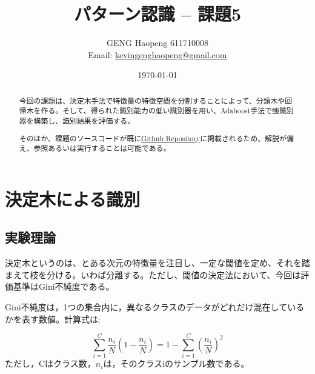 \documentclass[ %
  uplatex,%
  papersize%
]{jsarticle}
\title{パターン認識 -- 課題5}
\author{\large GENG Haopeng 611710008 \\ \small Email:  \href{mailto:kevingenghaopeng@gmail.com}{kevingenghaopeng@gmail.com}}
\affil{\small Department of Intelligent Systems, Nagoya University}
\date{\today}
\begin{document}
\maketitle

\begin{abstract}
今回の課題は、決定木手法で特徴量の特徴空間を分割することによって、分類木や回帰木を作る。そして、得られた識別能力の低い識別器を用い、Adaboost手法で強識別器を構築し、識別結果を評価する。

そのほか、課題のソースコードが既に\href{https://github.com/Secondtonumb/pattern_recogn/tree/master/pattern05}{Github Repository}に掲載されるため、解説が備え、参照あるいは実行することは可能である。
\end{abstract}

\section{決定木による識別}
\subsection{実験理論}
決定木というのは、とある次元の特徴量を注目し、一定な閾値を定め、それを踏まえて枝を分ける。いわば分離する。ただし、閾値の決定法において、今回は評価基準はGini不純度である。

Gini不純度は，1つの集合内に，異なるクラスのデータがどれだけ混在しているかを表す数値。計算式は:

$$\sum_{i=1}^{C}\frac{n_{i}}{N}(1-\frac{n_{i}}{N})=1 - \sum_{i=1}^{C}(\frac{n_{i}}{N})^2$$
ただし，Cはクラス数，$n_{i}$は，そのクラスiのサンプル数である。
\end{document}
